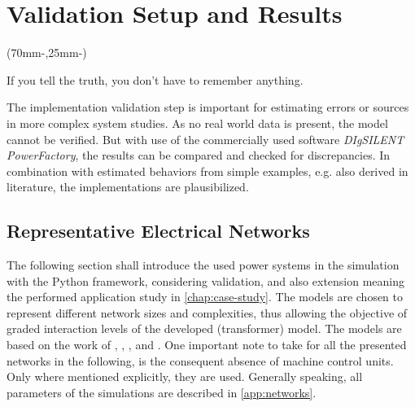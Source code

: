 

\chapter{Validation Setup and Results}
\label{chap:verification}

\begin{textblock*}{.7\textwidth}(70mm-\offset,25mm-\offset)
    \begin{fquote}
        If you tell the truth, you don't have to remember anything.
    \end{fquote}
\end{textblock*}

The implementation validation step is important for estimating errors or sources in more complex system studies.
As no real world data is present, the model cannot be verified.
But with use of the commercially used software \textit{DIgSILENT PowerFactory}, the results can be compared and checked for discrepancies.
In combination with estimated behaviors from simple examples, e.g. also derived in literature, the implementations are plausibilized.

\section{Representative Electrical Networks}
\label{sec:networks}

The following section shall introduce the used power systems in the simulation with the Python framework, considering validation, and also extension meaning the performed application study in \autoref{chap:case-study}. 
The models are chosen to represent different network sizes and complexities, thus allowing the objective of graded interaction levels of the developed (transformer) model. 
The models are based on the work of \textcite{machowski_2020}, \textcite{kundur_2022}, \textcite{IEEELoadModeling_2022}, and \textcite{vancutsem_2020}.
One important note to take for all the presented networks in the following, is the consequent absence of machine control units. 
Only where mentioned explicitly, they are used.
Generally speaking, all parameters of the simulations are described in \autoref{app:networks}.

